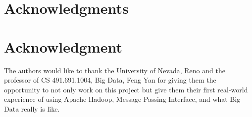 \documentclass[10pt,journal,compsoc]{IEEEtran}
\begin{document}
\ifCLASSOPTIONcompsoc
  \section*{Acknowledgments}
\else
  \section*{Acknowledgment}
\fi


The authors would like to thank the University of Nevada, Reno and the professor of CS 491.691.1004, Big Data, Feng Yan for giving them the opportunity to not only work on this project but give them their first real-world experience of using Apache Hadoop, Message Passing Interface, and what Big Data really is like.


\ifCLASSOPTIONcaptionsoff
  \newpage
\fi





%
%
%








\end{document}
